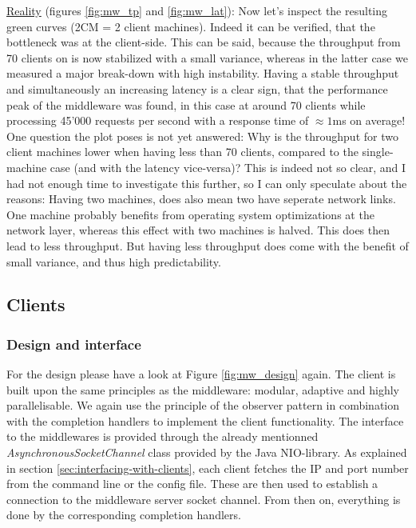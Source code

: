 \documentclass[11pt]{article}
\begin{document}
\newline\underline{Reality} (figures \ref{fig:mw_tp} and \ref{fig:mw_lat}): Now let's inspect the resulting green curves (2CM = 2 client machines). Indeed it can be verified, that the bottleneck was at the client-side. This can be said, because the throughput from 70 clients on is now stabilized with a small variance, whereas in the latter case we measured a major break-down with high instability. Having a stable throughput and simultaneously an increasing latency is a clear sign, that the performance peak of the middleware was found, in this case at around 70 clients while processing 45'000 requests per second with a response time of $\approx1$ms on average! One question the plot poses is not yet answered: Why is the throughput for two client machines lower when having less than 70 clients, compared to the single-machine case (and with the latency vice-versa)? This is indeed not so clear, and I had not enough time to investigate this further, so I can only speculate about the reasons: Having two machines, does also mean two have seperate network links. One machine probably benefits from operating system optimizations at the network layer, whereas this effect with two machines is halved. This does then lead to less throughput. But having less throughput does come with the benefit of small variance, and thus high predictability.

\subsection{Clients}\label{sec:clients}

\subsubsection{Design and interface}\label{sec:design-and-interface}
For the design please have a look at Figure \ref{fig:mw_design} again. The client is built upon the same principles as the middleware: modular, adaptive and highly parallelisable. We again use the principle of the observer pattern in combination with the completion handlers to implement the client functionality. The interface to the middlewares is provided through the already mentionned \textit{AsynchronousSocketChannel} class provided by the Java NIO-library. As explained in section \ref{sec:interfacing-with-clients}, each client fetches the IP and port number from the command line or the config file. These are then used to establish a connection to the middleware server socket channel. From then on, everything is done by the corresponding completion handlers.
\end{document}
